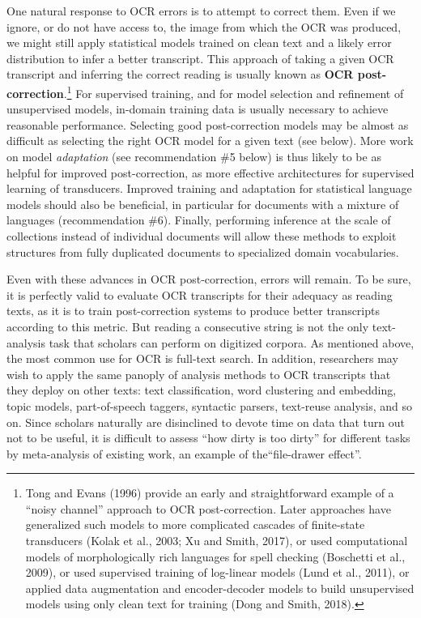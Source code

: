 \documentclass[twoside,11pt]{report}
\begin{document}
One natural response to OCR errors is to attempt to correct them. Even if we ignore, or do not have access to, the image from which the OCR was produced, we might still apply statistical models trained on clean text and a likely error distribution to infer a better transcript. This approach of taking a given OCR transcript and inferring the correct reading is usually known as \textbf{OCR post-correction}.\footnote{Tong and Evans (1996) provide an early and straightforward example of a ``noisy channel'' approach to OCR post-correction. Later approaches have generalized such models to more complicated cascades of finite-state transducers (Kolak et al., 2003; Xu and Smith, 2017), or used computational models of morphologically rich languages for spell checking (Boschetti et al., 2009), or used supervised training of log-linear models (Lund et al., 2011), or applied data augmentation and encoder-decoder models to build unsupervised models using only clean text for training (Dong and Smith, 2018).}  For supervised training, and for model selection and refinement of unsupervised models, in-domain training data is usually necessary to achieve reasonable performance. Selecting good post-correction models may be almost as difficult as selecting the right OCR model for a given text (see below). More work on model \emph{adaptation} (see recommendation \#5 below) is thus likely to be as helpful for improved post-correction, as more effective architectures for supervised learning of transducers. Improved training and adaptation for statistical language models should also be beneficial, in particular for documents with a mixture of languages (recommendation \#6). Finally, performing inference at the scale of collections instead of individual documents will allow these methods to exploit structures from fully duplicated documents to specialized domain vocabularies.

Even with these advances in OCR post-correction, errors will remain. To be sure, it is perfectly valid to evaluate OCR transcripts for their adequacy as reading texts, as it is to train post-correction systems to produce better transcripts according to this metric. But reading a consecutive string is not the only text-analysis task that scholars can perform on digitized corpora. As mentioned above, the most common use for OCR is full-text search. In addition, researchers may wish to apply the same panoply of analysis methods to OCR transcripts that they deploy on other texts: text classification, word clustering and embedding, topic models, part-of-speech taggers, syntactic parsers, text-reuse analysis, and so on. Since scholars naturally are disinclined to devote time on data that turn out not to be useful, it is difficult to assess ``how dirty is too dirty'' for different tasks by meta-analysis of existing work, an example of the``file-drawer effect''.
\end{document}
